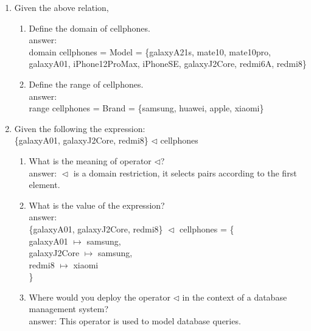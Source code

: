 \documentclass[12pt]{article}
\begin{document}
\begin{enumerate}
	\item Given the above relation,
	\begin{enumerate}
		\item Define the domain of cellphones.\\
		answer: \\
		\indent domain cellphones = Model = \{galaxyA21s, mate10, mate10pro, galaxyA01, iPhone12ProMax, iPhoneSE, galaxyJ2Core, redmi6A, redmi8\}		
		\item Define the range of cellphones.\\
		answer: \\
		range cellphones = Brand = \{samsung, huawei, apple, xiaomi\}
	\end{enumerate}

	\item Given the following the expression:\\ \{galaxyA01, galaxyJ2Core, redmi8\} $\lhd$ cellphones
	\begin{enumerate}
		\item What is the meaning of operator $\lhd$? \\
			answer: $\vartriangleleft$ is a domain restriction, it selects pairs according to the first element.
		\item What is the value of the expression?	\\
		\indent answer: \\ 
		\indent \{galaxyA01, galaxyJ2Core, redmi8\} $\vartriangleleft$ cellphones = \{ \\
		galaxyA01 $\mapsto$ samsung, \\ 
		galaxyJ2Core $\mapsto$ samsung, \\
		redmi8 $\mapsto$ xiaomi \\ 	
		\}
		\item Where would you deploy the operator $\lhd$ in the context of a database management system?\\
		answer: This operator is used to model database queries.
	\end{enumerate}


\end{enumerate}
\end{document}
